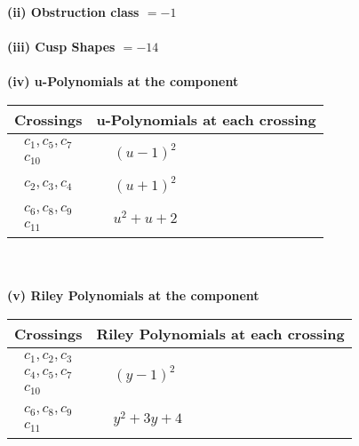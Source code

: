 \documentclass[1p]{elsarticle_modified}
\theoremstyle{definition}
\begin{document}
\flushleft \textbf{(ii) Obstruction class $= -1$}\\~\\
\flushleft \textbf{(iii) Cusp Shapes $= -14$}\\~\\
\newpage\renewcommand{\arraystretch}{1}
\flushleft \textbf{(iv) u-Polynomials at the component}\newline \\
\begin{tabular}{m{50pt}|m{274pt}}
Crossings & \hspace{64pt}u-Polynomials at each crossing \\
\hline $$\begin{aligned}c_{1},c_{5},c_{7}\\c_{10}\end{aligned}$$&$\begin{aligned}
&(u-1)^2
\end{aligned}$\\
\hline $$\begin{aligned}c_{2},c_{3},c_{4}\end{aligned}$$&$\begin{aligned}
&(u+1)^2
\end{aligned}$\\
\hline $$\begin{aligned}c_{6},c_{8},c_{9}\\c_{11}\end{aligned}$$&$\begin{aligned}
&u^2+u+2
\end{aligned}$\\
\hline
\end{tabular}\\~\\
\newpage\renewcommand{\arraystretch}{1}
\flushleft \textbf{(v) Riley Polynomials at the component}\newline \\
\begin{tabular}{m{50pt}|m{274pt}}
Crossings & \hspace{64pt}Riley Polynomials at each crossing \\
\hline $$\begin{aligned}c_{1},c_{2},c_{3}\\c_{4},c_{5},c_{7}\\c_{10}\end{aligned}$$&$\begin{aligned}
&(y-1)^2
\end{aligned}$\\
\hline $$\begin{aligned}c_{6},c_{8},c_{9}\\c_{11}\end{aligned}$$&$\begin{aligned}
&y^2+3 y+4
\end{aligned}$\\
\hline
\end{tabular}\\~\\
\end{document}
